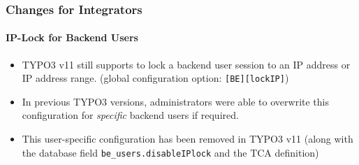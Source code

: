 %

\begin{frame}[fragile]
	\frametitle{Changes for Integrators}
	\framesubtitle{IP-Lock for Backend Users}


	\begin{itemize}
		\item TYPO3 v11 still supports to lock a backend user session to an
			IP address or IP address range.\newline
			\smaller(global configuration option: \texttt{[BE][lockIP]})\normalsize
		\item In previous TYPO3 versions, administrators were able to overwrite
			this configuration for \textit{specific} backend users if required.
		\item This user-specific configuration has been removed in TYPO3 v11\normalsize
			\smaller(along with the database field \texttt{be\_users.disableIPlock}
				and the TCA definition)\normalsize
	\end{itemize}
\end{frame}

